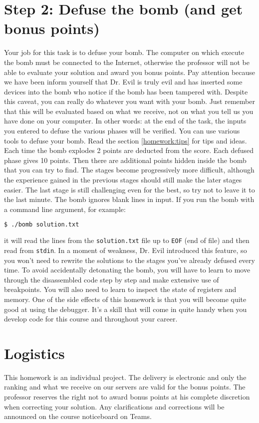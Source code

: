 \documentclass[a4paper,12pt]{report}  %
\newcommand{\lstinlinebg}[1]{\colorbox{backcolour}{\lstinline|#1|}}
\begin{document}
\section{Step 2: Defuse the bomb (and get bonus points)}
Your job for this task is to defuse your bomb. The computer on which
execute the bomb must be connected to the Internet, otherwise the professor will not be able to evaluate
your solution and award you bonus points. Pay attention because we have been 
inform yourself that Dr. Evil is truly evil and has inserted some devices into the bomb
who notice if the bomb has been tampered with.
Despite this caveat, you can really do whatever you want with your bomb. Just remember
that this will be evaluated based on what we receive, not on what you tell us you have
done on your computer. In other words: at the end of the task, the inputs you entered to defuse the various phases will be verified.
You can use various tools to defuse your bomb. Read the section \ref{homework:tips} for tips and ideas.
Each time the bomb explodes 2 points are deducted from the score. Each defused phase gives 10 points.
Then there are additional points hidden inside the bomb that you can try to find.
The stages become progressively more difficult, although the experience gained in the previous stages should still make the later stages easier.
The last stage is still challenging even for the best, so try not to leave it to the last minute.
The bomb ignores blank lines in input. If you run the bomb with a command line argument, for example:
\begin{lstlisting}[language=bash,numbers=none]
$ ./bomb solution.txt
\end{lstlisting}
it will read the lines from the \lstinlinebg{solution.txt} file up to \lstinlinebg{EOF} (end of file) and then read from \lstinlinebg{stdin}.
In a moment of weakness, Dr. Evil introduced this feature, so you won't need to rewrite the solutions to the stages you've already defused every time.
To avoid accidentally detonating the bomb, you will have to learn to move through the disassembled code step by step and make extensive use of breakpoints.
You will also need to learn to inspect the state of registers and memory. One of the side effects of this homework is that you will become quite good at using the debugger.
It's a skill that will come in quite handy when you develop code for this course and throughout your career.

\section{Logistics}
This homework is an individual project.
The delivery is electronic and only the ranking and what we receive on our servers are valid for the bonus points.
The professor reserves the right not to award bonus points at his complete discretion when correcting your solution.
Any clarifications and corrections will be announced on the course noticeboard on Teams.
\end{document}
